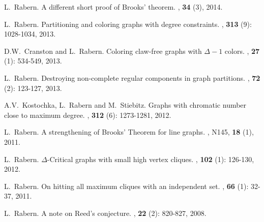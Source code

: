 \documentclass[margin,line]{res}
\begin{document}
\begin{resume}
\begin{enumerate}[{[}1{]}]
\item
L.~Rabern.
\newblock A different short proof of Brooks' theorem.
,  \textbf{34} (3), 2014.

\smallskip

\item
L.~Rabern.
\newblock Partitioning and coloring graphs with degree constraints.
, \textbf{313} (9): 1028-1034, 2013.

\smallskip

\item
D.W.~Cranston and L.~Rabern.
\newblock Coloring claw-free graphs with $\Delta - 1$ colors.
, \textbf{27} (1): 534-549, 2013.

\smallskip

\item
L.~Rabern.
\newblock Destroying non-complete regular components in graph partitions.
, \textbf{72} (2): 123-127, 2013.

\smallskip

\item A.V.~Kostochka, L.~Rabern and M.~Stiebitz.
\newblock Graphs with chromatic number close to maximum degree.
,  \textbf{312} (6): 1273-1281, 2012.

\smallskip

\item L.~Rabern.
\newblock A strengthening of Brooks' Theorem for line graphs.
, N145, \textbf{18} (1), 2011.

\smallskip

\item L.~Rabern.
\newblock $\Delta$-Critical graphs with small high vertex cliques.
, \textbf{102} (1): 126-130, 2012.

\smallskip

\item L.~Rabern. 
\newblock On hitting all maximum cliques with an independent set.
, \textbf{66} (1): 32-37, 2011.

\smallskip

\item L.~Rabern.
\newblock A note on Reed's conjecture.
, \textbf{22} (2): 820-827, 
	2008.


\end{enumerate}
\end{resume}
\end{document}
